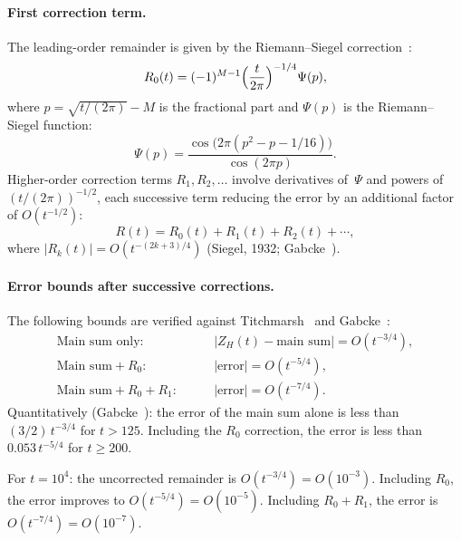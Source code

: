 \paragraph{First correction term.}
The leading-order remainder is given by the Riemann--Siegel
correction~\cite{gabcke1979}:
\begin{equation}\label{eq:rs-R0}
  R_0(t) = (-1)^{M-1}\Bigl(\frac{t}{2\pi}\Bigr)^{-1/4}\Psi(p),
\end{equation}
where $p = \sqrt{t/(2\pi)} - M$ is the fractional part and $\Psi(p)$ is the
Riemann--Siegel function:
\begin{equation}\label{eq:rs-psi}
  \Psi(p) = \frac{\cos\bigl(2\pi(p^2 - p - 1/16)\bigr)}{\cos(2\pi p)}.
\end{equation}
Higher-order correction terms $R_1, R_2, \ldots$ involve derivatives of~$\Psi$ and
powers of $(t/(2\pi))^{-1/2}$, each successive term reducing the error by an additional
factor of $O(t^{-1/2})$:
\begin{equation}\label{eq:rs-expansion}
  R(t) = R_0(t) + R_1(t) + R_2(t) + \cdots,
\end{equation}
where $|R_k(t)| = O(t^{-(2k+3)/4})$ (Siegel, 1932; Gabcke~\cite{gabcke1979}).

\paragraph{Error bounds after successive corrections.}
The following bounds are verified against
Titchmarsh~\cite{titchmarsh1986} and Gabcke~\cite{gabcke1979}:
\begin{align}
  \text{Main sum only:}\qquad &|Z_H(t) - \text{main sum}| = O(t^{-3/4}),
    \label{eq:rs-err0}\\
  \text{Main sum} + R_0:\qquad &|\text{error}| = O(t^{-5/4}),
    \label{eq:rs-err1}\\
  \text{Main sum} + R_0 + R_1:\qquad &|\text{error}| = O(t^{-7/4}).
    \label{eq:rs-err2}
\end{align}
Quantitatively (Gabcke~\cite{gabcke1979}): the error of the main sum alone is less than
$(3/2)\,t^{-3/4}$ for $t > 125$. Including the $R_0$ correction, the error is less than
$0.053\,t^{-5/4}$ for $t \ge 200$.

For $t = 10^4$: the uncorrected remainder is $O(t^{-3/4}) = O(10^{-3})$. Including
$R_0$, the error improves to $O(t^{-5/4}) = O(10^{-5})$. Including $R_0 + R_1$, the
error is $O(t^{-7/4}) = O(10^{-7})$.

